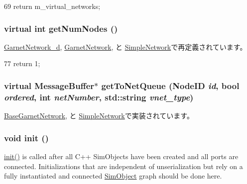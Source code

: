\begin{DoxyCode}
69 { return m_virtual_networks; }
\end{DoxyCode}
\hypertarget{classNetwork_a7624554588ea569f360d6ea8e1cad409}{
\subsubsection[{getNumNodes}]{\setlength{\rightskip}{0pt plus 5cm}virtual int getNumNodes ()}}
\label{classNetwork_a7624554588ea569f360d6ea8e1cad409}


\hyperlink{classGarnetNetwork__d_a52ab76ba6f0a40a06c6fc4043351824e}{GarnetNetwork\_\-d}, \hyperlink{classGarnetNetwork_a52ab76ba6f0a40a06c6fc4043351824e}{GarnetNetwork}, と \hyperlink{classSimpleNetwork_a52ab76ba6f0a40a06c6fc4043351824e}{SimpleNetwork}で再定義されています。


\begin{DoxyCode}
77 {return 1;}
\end{DoxyCode}
\hypertarget{classNetwork_aeb27c17e088f115f8b5e3366c9ef8415}{
\subsubsection[{getToNetQueue}]{\setlength{\rightskip}{0pt plus 5cm}virtual {\bf MessageBuffer}$\ast$ getToNetQueue ({\bf NodeID} {\em id}, \/  bool {\em ordered}, \/  int {\em netNumber}, \/  std::string {\em vnet\_\-type})}}
\label{classNetwork_aeb27c17e088f115f8b5e3366c9ef8415}


\hyperlink{classBaseGarnetNetwork_a19d1e55629eb66ec0e248558198f327a}{BaseGarnetNetwork}, と \hyperlink{classSimpleNetwork_a4b74c5f7524d071a8cb6137eca7942bd}{SimpleNetwork}で実装されています。\hypertarget{classNetwork_a02fd73d861ef2e4aabb38c0c9ff82947}{
\subsubsection[{init}]{\setlength{\rightskip}{0pt plus 5cm}void init ()}}
\label{classNetwork_a02fd73d861ef2e4aabb38c0c9ff82947}
\hyperlink{classNetwork_a02fd73d861ef2e4aabb38c0c9ff82947}{init()} is called after all C++ SimObjects have been created and all ports are connected. Initializations that are independent of unserialization but rely on a fully instantiated and connected \hyperlink{classSimObject}{SimObject} graph should be done here. 


